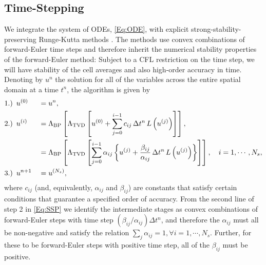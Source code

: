 \documentclass[letterpaper]{jpconf}
\begin{document}
\subsection{Time-Stepping}
We integrate the system of ODEs, \eqref{Eq:ODE}, with explicit strong-stability-preserving Runge-Kutta methods \cite{ShuOsher1988}. The methods use convex combinations of forward-Euler time steps and therefore inherit the numerical stability properties of the forward-Euler method: Subject to a CFL restriction on the time step, we will have stability of the cell averages and also high-order accuracy in time. Denoting by $u^{n}$ the solution for all of the variables across the entire spatial domain at a time $t^{n}$, the algorithm is given by
 \begin{alignat}{2}
 1.)&\hspace{0.5em}u^{\left(0\right)}&&=u^{n},\notag\\
 2.)&\hspace{0.5em}u^{\left(i\right)}&&=\Lambda_{\text{BP}}\left[\Lambda_{\text{TVD}}\left[u^{\left(0\right)}+\sum\limits_{j=0}^{i-1}c_{ij}\,\Delta t^{n}\,L\left(u^{\left(j\right)}\right)\right]\right],\notag\\
 &\hspace{1em}&&=\Lambda_{\text{BP}}\left[\Lambda_{\text{TVD}}\left[\sum\limits_{j=0}^{i-1}\alpha_{ij}\left\{u^{\left(j\right)}+\frac{\beta_{ij}}{\alpha_{ij}}\,\Delta t^{n}\,L\left(u^{\left(j\right)}\right)\right\}\right]\right],\hspace{1em}i=1,\cdots,N_{s},\notag\\
 3.)&\hspace{0.5em}u^{n+1}&&=u^{\left(N_{s}\right)},\label{Eq:SSP}
 \end{alignat}
where $c_{ij}$ (and, equivalently, $\alpha_{ij}$ and $\beta_{ij}$) are constants that satisfy certain conditions that guarantee a specified order of accuracy. From the second line of step 2 in \eqref{Eq:SSP} we identify the intermediate stages as convex combinations of forward-Euler steps with time step $(\beta_{ij}/\alpha_{ij})\Delta t^{n}$, and therefore the $\alpha_{ij}$ must all be non-negative and satisfy the relation $\sum_{j}\alpha_{ij}=1,\forall i=1,\cdots,N_{s}$. Further, for these to be forward-Euler steps with positive time step, all of the $\beta_{ij}$ must be positive.
\end{document}
